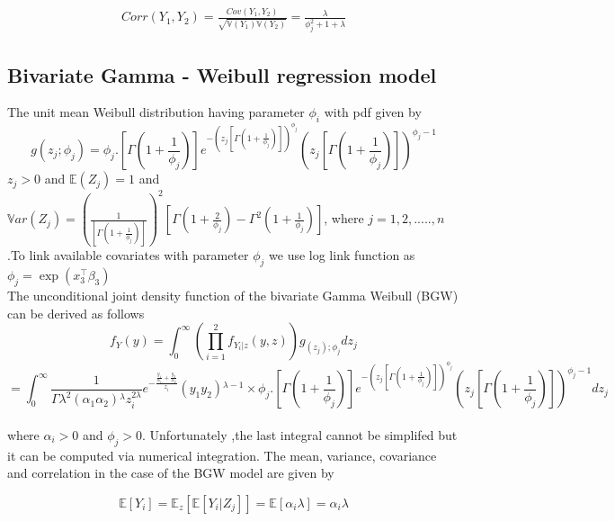 \documentclass[12pt]{article}%
\theoremstyle{definition}
\theoremstyle{remark}
\begin{document}
\begin{align}
	Corr(Y_1,Y_2)=\frac{Cov(Y_1,Y_2)}{\sqrt{\mathbb{V}(Y_1)\mathbb{V}(Y_2)}}=\frac{\lambda}{\phi_j^2+1+\lambda}
\end{align}




\subsection{ Bivariate Gamma - Weibull regression model }
The unit mean Weibull distribution having  parameter $\phi_{i}$ with  pdf given by
\begin{equation}
	g(z_{j};\phi_{j})=\phi_{j}.\left [\Gamma\left(1+\frac{1}{\phi_{j}}\right)\right]  e^{-\left(z_{j}\left [\Gamma(1+\frac{1}{\phi_{j}})\right]\right)^{\phi_{j}}}\left(z_{j}\left [\Gamma\left(1+\frac{1}{\phi_{j}}\right)\right]\right)^{\phi_{j}-1}
\end{equation}
$z_{j}>0$ and $\mathbb{E}(Z_{j})=1$ and $\mathbb{V}ar(Z_{j})=\left(\frac{1}{\left [\Gamma\left(1+\frac{1}{\phi_{j}}\right)\right]}\right)^{2}\left[\Gamma\left(1+\frac{2}{\phi_{j}}\right)-\Gamma^{2}\left(1+\frac{1}{\phi_{j}}\right)\right]$, where $j=1,2,.....,n$.To link available covariates with parameter $\phi_j$ we use log link function as $\phi_j = \exp(x_3^\top \beta_3)$ \\
The unconditional joint density function of the bivariate Gamma Weibull (BGW) can be derived as follows
\begin{equation*}
	f_Y(y)= \int _0^{\infty }(\prod _{i=1}^2 f_{Y_{i}|z}(y,z))g_{(z_j);\phi_{j}} dz_j
\end{equation*}
\small
\begin{equation*}
		=\int _0^{\infty }\frac{1}{\Gamma \lambda ^2 \left(\alpha _1 \alpha _2\right){}^{\lambda } z_i^{2 \lambda }}e^{-\frac{\frac{y_1}{\alpha _1}+\frac{y_2}{\alpha _2}}{z_i}}\left(y_1 y_2\right){}^{\lambda -1}\times\phi_{j}.\left [\Gamma\left(1+\frac{1}{\phi_{j}}\right)\right]  e^{-\left(z_{j}\left [\Gamma(1+\frac{1}{\phi_{j}})\right]\right)^{\phi_{j}}}\left(z_{j}\left [\Gamma\left(1+\frac{1}{\phi_{j}}\right)\right]\right)^{\phi_{j}-1} dz_j
\end{equation*}\\
where $\alpha_i >0 $ and $\phi_j >0$. Unfortunately ,the last integral cannot be simplifed but it can be computed via numerical integration. 
The mean, variance, covariance and correlation in the case of the BGW model are given by

\begin{equation}
	\mathbb{E}[Y_i]=\mathbb{E}_z[\mathbb{E}[Y_i|Z_j]]=\mathbb{E}[\alpha_{i}\lambda]=\alpha_{i}\lambda
\end{equation}
\end{document}
